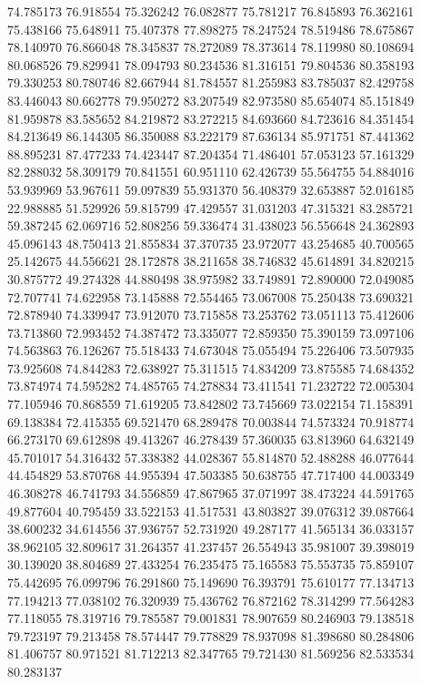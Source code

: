 74.785173
76.918554
75.326242
76.082877
75.781217
76.845893
76.362161
75.438166
75.648911
75.407378
77.898275
78.247524
78.519486
78.675867
78.140970
76.866048
78.345837
78.272089
78.373614
78.119980
80.108694
80.068526
79.829941
78.094793
80.234536
81.316151
79.804536
80.358193
79.330253
80.780746
82.667944
81.784557
81.255983
83.785037
82.429758
83.446043
80.662778
79.950272
83.207549
82.973580
85.654074
85.151849
81.959878
83.585652
84.219872
83.272215
84.693660
84.723616
84.351454
84.213649
86.144305
86.350088
83.222179
87.636134
85.971751
87.441362
88.895231
87.477233
74.423447
87.204354
71.486401
57.053123
57.161329
82.288032
58.309179
70.841551
60.951110
62.426739
55.564755
54.884016
53.939969
53.967611
59.097839
55.931370
56.408379
32.653887
52.016185
22.988885
51.529926
59.815799
47.429557
31.031203
47.315321
83.285721
59.387245
62.069716
52.808256
59.336474
31.438023
56.556648
24.362893
45.096143
48.750413
21.855834
37.370735
23.972077
43.254685
40.700565
25.142675
44.556621
28.172878
38.211658
38.746832
45.614891
34.820215
30.875772
49.274328
44.880498
38.975982
33.749891
72.890000
72.049085
72.707741
74.622958
73.145888
72.554465
73.067008
75.250438
73.690321
72.878940
74.339947
73.912070
73.715858
73.253762
73.051113
75.412606
73.713860
72.993452
74.387472
73.335077
72.859350
75.390159
73.097106
74.563863
76.126267
75.518433
74.673048
75.055494
75.226406
73.507935
73.925608
74.844283
72.638927
75.311515
74.834209
73.875585
74.684352
73.874974
74.595282
74.485765
74.278834
73.411541
71.232722
72.005304
77.105946
70.868559
71.619205
73.842802
73.745669
73.022154
71.158391
69.138384
72.415355
69.521470
68.289478
70.003844
74.573324
70.918774
66.273170
69.612898
49.413267
46.278439
57.360035
63.813960
64.632149
45.701017
54.316432
57.338382
44.028367
55.814870
52.488288
46.077644
44.454829
53.870768
44.955394
47.503385
50.638755
47.717400
44.003349
46.308278
46.741793
34.556859
47.867965
37.071997
38.473224
44.591765
49.877604
40.795459
33.522153
41.517531
43.803827
39.076312
39.087664
38.600232
34.614556
37.936757
52.731920
49.287177
41.565134
36.033157
38.962105
32.809617
31.264357
41.237457
26.554943
35.981007
39.398019
30.139020
38.804689
27.433254
76.235475
75.165583
75.553735
75.859107
75.442695
76.099796
76.291860
75.149690
76.393791
75.610177
77.134713
77.194213
77.038102
76.320939
75.436762
76.872162
78.314299
77.564283
77.118055
78.319716
79.785587
79.001831
78.907659
80.246903
79.138518
79.723197
79.213458
78.574447
79.778829
78.937098
81.398680
80.284806
81.406757
80.971521
81.712213
82.347765
79.721430
81.569256
82.533534
80.283137
